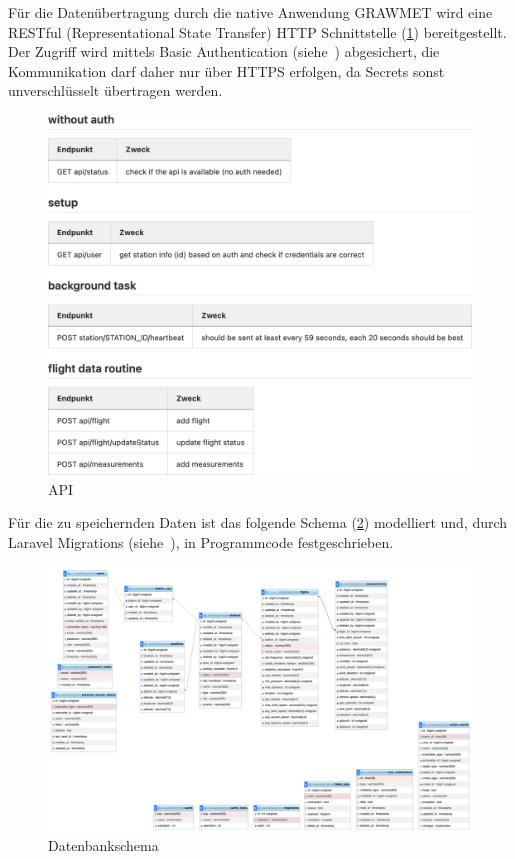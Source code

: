 Für die Datenübertragung durch die native Anwendung GRAWMET wird eine RESTful (Representational State Transfer) HTTP Schnittstelle (\ref{fig:api}) bereitgestellt.
Der Zugriff wird mittels Basic Authentication (siehe~\cite{rfc7235}) abgesichert, die Kommunikation darf daher nur über HTTPS erfolgen, da Secrets sonst unverschlüsselt übertragen werden.
\begin{figure}[h!]
    \centering
    \caption{API}
    \label{fig:api}
    \includegraphics[scale=0.55]{assets/api}
\end{figure}

Für die zu speichernden Daten ist das folgende Schema (\ref{fig:db}) modelliert und, durch Laravel Migrations (siehe~\cite{laravel/migrations}), in Programmcode festgeschrieben.
\begin{figure}[h!]
    \centering
    \caption{Datenbankschema}
    \label{fig:db}
    \includegraphics[scale=0.33,angle=90]{assets/db}
\end{figure}

